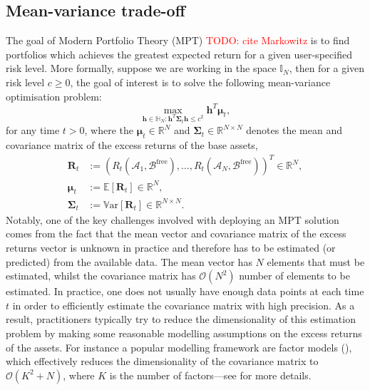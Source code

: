 \documentclass[12pt]{article}
\let\cref\crtcref
\begin{document}
\subsection{Mean-variance trade-off}
\label{sec:mean_variance}
The goal of Modern Portfolio Theory (MPT) \textcolor{red}{TODO: cite Markowitz} is to find portfolios which achieves the greatest expected return for a given user-specified risk level. More formally, suppose we are working in the space $\mathbb{I}_N$, then for a given risk level $c \geq 0$, the goal of interest is to solve the following mean-variance optimisation problem:
\begin{equation}
	\max_{\mathbf{h} \in \mathbb{H}_N: \mathbf{h}^T\boldsymbol{\Sigma}_t \mathbf{h} \leq c^2} \mathbf{h}^T \boldsymbol{\mu}_t,
	\label{eqn:mean_variance_problem}
\end{equation}
for any time $t > 0$, where the $\mathbf{\mu}_t \in \mathbb{R}^N$ and $\boldsymbol{\Sigma}_t \in \mathbb{R}^{N \times N}$ denotes the mean and covariance matrix of the excess returns of the base assets,
\begin{align}
	\mathbf{R}_t &:= (R_t(\mathcal{A}_1, \mathcal{B}^{\text{free}}), \dots, R_t(\mathcal{A}_N, \mathcal{B}^{\text{free}}))^T \in \mathbb{R}^N,
	\\
	\boldsymbol{\mu}_t &:= \mathbb{E}[\mathbf{R}_t] \in \mathbb{R}^N,
	\\
	\boldsymbol{\Sigma}_t &:= \mathbb{V}\text{ar}[\mathbf{R}_t] \in \mathbb{R}^{N \times N}.
\end{align}
Notably, one of the key challenges involved with deploying an MPT solution comes from the fact that the mean vector and covariance matrix of the excess returns vector is unknown in practice and therefore has to be estimated (or predicted) from the available data. The mean vector has $N$ elements that must be estimated, whilst the covariance matrix has $\mathcal{O}(N^2)$ number of elements to be estimated. In practice, one does not usually have enough data points at each time $t$ in order to efficiently estimate the covariance matrix with high precision. As a result, practitioners typically try to reduce the dimensionality of this estimation problem by making some reasonable modelling assumptions on the excess returns of the assets. For instance a popular modelling framework are factor models (\cref{sec:factor_models}), which effectively reduces the dimensionality of the covariance matrix to $\mathcal{O}(K^2 + N)$, where $K$ is the number of factors---see \cref{sec:factor_models} for more details.
\end{document}
